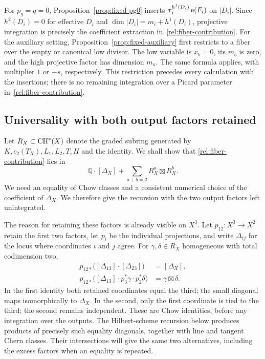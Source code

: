 For $p_g=q=0$, Proposition~\ref{prop:fixed-pg0} inserts
$x_i^{h^1(D_i)}\operatorname{e}(F_i)$ on $|D_i|$.
Since $h^2(D_i)=0$ for effective $D_i$ and
$\dim|D_i|=m_i+h^1(D_i)$, projective integration is precisely the
coefficient extraction in~\eqref{rel:fiber-contribution}.
For the auxiliary setting, Proposition~\ref{prop:fixed-auxiliary}
first restricts to a fiber over the empty or canonical low divisor.
The low variable is $x_b=0$, its $m_b$ is zero, and the high projective
factor has dimension $m_a$.  The same formula applies, with multiplier
$1$ or $-s$, respectively.  This restriction precedes every calculation
with the insertions; there is no remaining integration over a Picard
parameter in~\eqref{rel:fiber-contribution}.

\subsection{Universality with both output factors retained}

Let $R_X\subset\operatorname{CH}^*(X)$ denote the graded subring generated by
$K,c_2(T_X),L_1,L_2,T,H$ and the identity.  We shall show that
\eqref{rel:fiber-contribution} lies in
\[
 \mathbb Q\cdot[\Delta_X]+\sum_{a+b=2}R_X^a\boxtimes R_X^b.
\]
We need an equality of Chow classes and a consistent numerical choice
of the coefficient of $\Delta_X$.  We therefore give the recursion
with the two output factors left unintegrated.

The reason for retaining these factors is already visible on $X^3$.
Let $p_{12}:X^3\to X^2$ retain the first two factors, let $p_i$ be
the individual projections, and write $\Delta_{ij}$ for the locus
where coordinates $i$ and $j$ agree.  For
$\gamma,\delta\in R_X$ homogeneous with total codimension two,
\begin{equation}\label{rel:three-slot-model}
 \begin{aligned}
 p_{12*}\bigl([\Delta_{13}]\cdot[\Delta_{23}]\bigr)
   &=[\Delta_X],\\
 p_{12*}\bigl([\Delta_{13}]\cdot p_3^*\gamma\cdot p_2^*\delta\bigr)
   &=\gamma\boxtimes\delta.
 \end{aligned}
\end{equation}
In the first identity both retained coordinates equal the third;
the small diagonal maps isomorphically to $\Delta_X$.
In the second, only the first coordinate is tied to the third;
the second remains independent.  These are Chow identities, before
any integration over the outputs.  The Hilbert-scheme recursion below
produces products of precisely such equality diagonals, together
with line and tangent Chern classes.  Their intersections will give
the same two alternatives, including the excess
factors when an equality is repeated.

